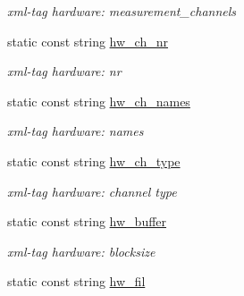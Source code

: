 \begin{DoxyCompactItemize}
\begin{DoxyCompactList}\small\item\em xml-\/tag hardware: measurement\_\-channels \item\end{DoxyCompactList}\item 
\hypertarget{class_constants_ae2719649ef8808a7b5d59e349a01b872}{
static const string \hyperlink{class_constants_ae2719649ef8808a7b5d59e349a01b872}{hw\_\-ch\_\-nr}}
\label{class_constants_ae2719649ef8808a7b5d59e349a01b872}

\begin{DoxyCompactList}\small\item\em xml-\/tag hardware: nr \item\end{DoxyCompactList}\item 
\hypertarget{class_constants_a66238c62d9958c8dae779164449d6452}{
static const string \hyperlink{class_constants_a66238c62d9958c8dae779164449d6452}{hw\_\-ch\_\-names}}
\label{class_constants_a66238c62d9958c8dae779164449d6452}

\begin{DoxyCompactList}\small\item\em xml-\/tag hardware: names \item\end{DoxyCompactList}\item 
\hypertarget{class_constants_ae972450bb36940f9f7618308c05575a5}{
static const string \hyperlink{class_constants_ae972450bb36940f9f7618308c05575a5}{hw\_\-ch\_\-type}}
\label{class_constants_ae972450bb36940f9f7618308c05575a5}

\begin{DoxyCompactList}\small\item\em xml-\/tag hardware: channel type \item\end{DoxyCompactList}\item 
\hypertarget{class_constants_a3219051bf73ed186b3e58249c6eb6727}{
static const string \hyperlink{class_constants_a3219051bf73ed186b3e58249c6eb6727}{hw\_\-buffer}}
\label{class_constants_a3219051bf73ed186b3e58249c6eb6727}

\begin{DoxyCompactList}\small\item\em xml-\/tag hardware: blocksize \item\end{DoxyCompactList}\item 
\hypertarget{class_constants_a076f87393177a84abd299729d22fadc7}{
static const string \hyperlink{class_constants_a076f87393177a84abd299729d22fadc7}{hw\_\-fil}}
\label{class_constants_a076f87393177a84abd299729d22fadc7}


\end{DoxyCompactItemize}
